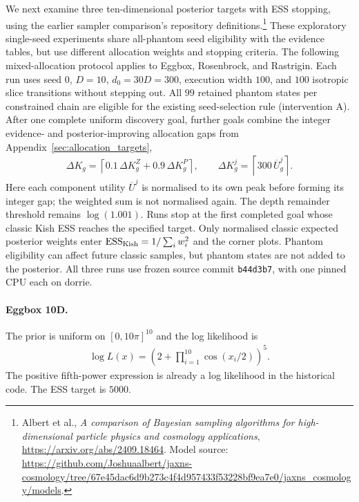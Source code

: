 \documentclass[pdflatex,sn-basic,icol]{sn-jnl}
\theoremstyle{plain}
\theoremstyle{definition}
\begin{document}
We next examine three ten-dimensional posterior targets with ESS stopping, using the earlier sampler comparison's repository definitions.\footnote{Albert et al., \emph{A comparison of Bayesian sampling algorithms for high-dimensional particle physics and cosmology applications}, \url{https://arxiv.org/abs/2409.18464}. Model source: \url{https://github.com/Joshuaalbert/jaxns-cosmology/tree/67e45dac6d9b273c4f4d957433f53228bf9ea7e0/jaxns_cosmology/models}.}
These exploratory single-seed experiments share all-phantom seed eligibility with the evidence tables, but use different allocation weights and stopping criteria. The following mixed-allocation protocol applies to Eggbox, Rosenbrock, and Rastrigin.
Each run uses seed $0$, $D=10$, $d_0=30D=300$, execution width $100$, and $100$ isotropic slice transitions without stepping out.
All $99$ retained phantom states per constrained chain are eligible for the existing seed-selection rule (intervention A).
After one complete uniform discovery goal, further goals combine the integer evidence- and posterior-improving allocation gaps from Appendix~\ref{sec:allocation_targets},
\begin{align}
    \Delta K_g=\left\lceil 0.1\,\Delta K^Z_g+0.9\,\Delta K^P_g\right\rceil,
    \qquad
    \Delta K^j_g=\left\lceil 300\,\overline{U}^j_g\right\rceil .
    \label{eq:posterior_candidate_allocation}
\end{align}
Here each component utility $\overline{U}^j$ is normalised to its own peak before forming its integer gap; the weighted sum is not normalised again.
The depth remainder threshold remains $\log(1.001)$.
Runs stop at the first completed goal whose classic Kish ESS reaches the specified target.
Only normalised classic expected posterior weights enter $\mathrm{ESS}_{\rm Kish}=1/\sum_i w_i^2$ and the corner plots.
Phantom eligibility can affect future classic samples, but phantom states are not added to the posterior.
All three runs use frozen source commit \texttt{b44d3b7}, with one pinned CPU each on dorrie.

\paragraph{Eggbox 10D.}
The prior is uniform on $[0,10\pi]^{10}$ and the log likelihood is
\begin{align}
    \log L(x)=\left(2+\prod_{i=1}^{10}\cos(x_i/2)\right)^5.
\end{align}
The positive fifth-power expression is already a log likelihood in the historical code.
The ESS target is $5000$.
\end{document}
